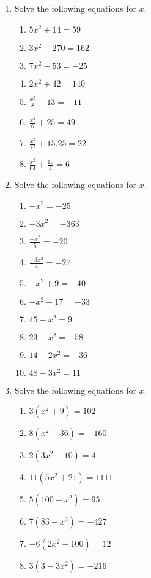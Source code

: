 \documentclass[a4paper,12pt]{article}
\begin{document}
\begin{enumerate}
\item Solve the following equations for $x$.
    \begin{multicols}{2}
    \begin{enumerate}
    \item $5x^2 + 14 = 59$
    \item $3x^2 - 270 = 162$
    \item $7x^2 - 53 = -25$
    \item $2x^2 + 42 = 140$
    \item $\displaystyle \frac{x^2}{8}-13 = -11$
    \item $\displaystyle \frac{x^2}{6} + 25 = 49$
    \item $\displaystyle \frac{x^2}{12} + 15.25 = 22$
    \item $\displaystyle \frac{x^2}{64} + \frac{15}{4} = 6$
    \end{enumerate}
    \end{multicols}

\item Solve the following equations for $x$.
    \begin{multicols}{2}
    \begin{enumerate}
    \item $-x^2 = -25$
    \item $-3x^2 = -363$
    \item $\displaystyle \frac{-x^2}{5} = -20$
    \item $\displaystyle \frac{-3x^2}{4} = -27$
    \item $-x^2 + 9 = -40$
    \item $-x^2 - 17 = -33$
    \item $45 - x^2 = 9$
    \item $23 - x^2 = -58$
    \item $14 - 2x^2 = -36$
    \item $48 - 3x^2 = 11$
    \end{enumerate}
    \end{multicols}

\item Solve the following equations for $x$.
    \begin{multicols}{2}
    \begin{enumerate}
    \item $3(x^2 + 9) = 102$
    \item $8(x^2 - 36) = -160$
    \item $2(3x^2 - 10) = 4$
    \item $11(5x^2 + 21) = 1111$
    \item $5(100 - x^2) = 95$
    \item $7(83 - x^2) = -427$
    \item $-6(2x^2 - 100) = 12$
    \item $3(3-3x^2) = -216$
    \end{enumerate}
    \end{multicols}


\end{enumerate}
\end{document}
